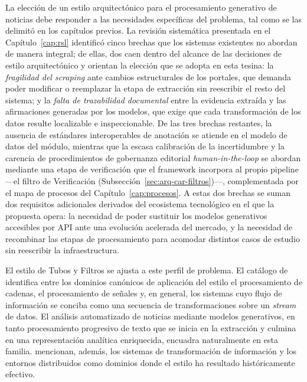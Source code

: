 \documentclass[12pt]{report}
\begin{document}
La elección de un estilo arquitectónico para el procesamiento generativo de noticias debe responder a las necesidades específicas del problema, tal como se las delimitó en los capítulos previos. La revisión sistemática presentada en el Capítulo~\ref{cap:rsl} identificó cinco brechas que los sistemas existentes no abordan de manera integral; de ellas, dos caen dentro del alcance de las decisiones de estilo arquitectónico y orientan la elección que se adopta en esta tesina: la \textit{fragilidad del scraping} ante cambios estructurales de los portales, que demanda poder modificar o reemplazar la etapa de extracción sin reescribir el resto del sistema; y la \textit{falta de trazabilidad documental} entre la evidencia extraída y las afirmaciones generadas por los modelos, que exige que cada transformación de los datos resulte localizable e inspeccionable. De las tres brechas restantes, la ausencia de estándares interoperables de anotación se atiende en el modelo de datos del módulo, mientras que la escasa calibración de la incertidumbre y la carencia de procedimientos de gobernanza editorial \textit{human-in-the-loop} se abordan mediante una etapa de verificación que el framework incorpora al propio pipeline ---el filtro de Verificación (Subsección~\ref{sec:arq-car-filtros})---, complementada por el mapa de procesos del Capítulo~\ref{cap:procesos}. A estas dos brechas se suman dos requisitos adicionales derivados del ecosistema tecnológico en el que la propuesta opera: la necesidad de poder sustituir los modelos generativos accesibles por API ante una evolución acelerada del mercado, y la necesidad de recombinar las etapas de procesamiento para acomodar distintos casos de estudio sin reescribir la infraestructura.

El estilo de Tubos y Filtros se ajusta a este perfil de problema. El catálogo de \citet[p.~21]{cristia:2025} identifica entre los dominios canónicos de aplicación del estilo el procesamiento de cadenas, el procesamiento de señales y, en general, los sistemas cuyo flujo de información se conciba como una secuencia de transformaciones sobre un \textit{stream} de datos. El análisis automatizado de noticias mediante modelos generativos, en tanto procesamiento progresivo de texto que se inicia en la extracción y culmina en una representación analítica enriquecida, encuadra naturalmente en esta familia. \citet{garlanshaw:1994} mencionan, además, los sistemas de transformación de información y los entornos distribuidos como dominios donde el estilo ha resultado históricamente efectivo.
\end{document}
